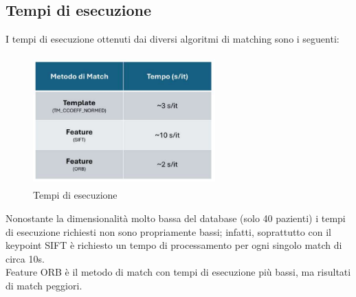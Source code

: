 \documentclass[12pt,a4paper,openright,twoside]{book}
\begin{document}
\subsection{Tempi di esecuzione}
I tempi di esecuzione ottenuti dai diversi algoritmi di matching sono i seguenti:
\begin{figure}[H]
	\centering
	\includegraphics[height=5cm,width=7cm]{figures/tempiprof.pdf}
    	\caption{Tempi di esecuzione}
	\label{fig:tempiprof}
\end{figure}

Nonostante la dimensionalità molto bassa del database (solo 40 pazienti) i tempi di esecuzione richiesti non sono propriamente bassi; infatti, soprattutto con il keypoint SIFT è richiesto un tempo di processamento per ogni singolo match di circa 10s.\\
Feature ORB è il metodo di match con tempi di esecuzione più bassi, ma risultati di match peggiori.


\end{document}
